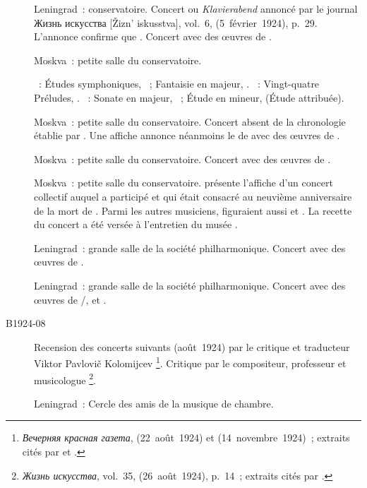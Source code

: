 \begin{description}
 \item[]
 Leningrad~: conservatoire.
 Concert ou \foreignlanguage{german}{\emph{Klavierabend}} annoncé par le
 journal \foreignlanguage{russian}{Жизнь искусства} [Žizn' iskusstva],
 vol.~6,  (5~février~1924), p.~29.
 L'annonce confirme que \VSofronitsky{} .
 Concert avec des œuvres de \Scriabine{}.
 \item[]
 Moskva~: petite salle du conservatoire.

 \textsc{\Schumann{}}~: Études symphoniques, ~; Fantaisie en \kC
 majeur, .
 \textsc{\Chopin{}}~: Vingt-quatre Préludes, .
 \textsc{\Scriabine{}}~: Sonate en \kF \Sharp majeur, ~; Étude en
 \kD \Sharp mineur,   (Étude attribuée).
 \item[]
 Moskva~: petite salle du conservatoire.
 Concert absent de la chronologie établie par \citet[p.~396]{Scriabine}.
 Une affiche annonce néanmoins le  de \Sofronitsky{}
 avec des œuvres de \Scriabine{}.
 \item[]
 Moskva~: petite salle du conservatoire.
 Concert avec des œuvres de \Scriabine{}.
 \item[]
 Moskva~: petite salle du conservatoire.
 \citet{Lazarev20} présente l'affiche d'un concert collectif auquel a
 participé \VSofronitsky{} et qui était consacré au neuvième anniversaire de
 la mort de \Scriabine{}.
 Parmi les autres musiciens, figuraient aussi \KIgumnov{} et \SFeinberg{}.
 La recette du concert a été versée à l'entretien du musée \Scriabine{}.
 \item[]
 Leningrad~: grande salle de la société philharmonique.
 Concert avec des œuvres de \Scriabine{}.
 \item[]
 Leningrad~: grande salle de la société philharmonique.
 Concert avec des œuvres de \JBach{}/\Busoni{}, \Liszt{} et \Chopin{}.
 \item[B1924-08]
 Recension des concerts suivants (août~1924) par le critique et traducteur
 Viktor Pavlovič Kolomijcev%
 \footnote{\foreignlanguage{russian}{\emph{Вечерняя красная газета}},
  (22~août~1924) et  (14~novembre~1924)~; extraits
 cités par \citet[p.~28-29]{Sofronitsky82a} et
 \citet[p.~422-423]{Milshteyn82a}.}.
 Critique par le compositeur, professeur et musicologue \VKaratigine{}%
 \footnote{\foreignlanguage{russian}{\emph{Жизнь искусства}}, vol.~35,
  (26~août~1924), p.~14~; extraits cités par
 \citet[p.~29-30]{Sofronitsky82a}.}.
 \item[]
 Leningrad~: Cercle des amis de la musique de chambre.


\end{description}
